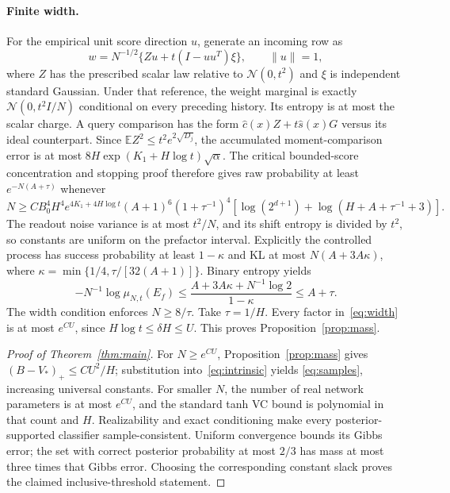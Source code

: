 \documentclass[11pt]{article}
\newcommand{\E}{\mathbb E}
\begin{document}
\paragraph{Finite width.}
For the empirical unit score direction $u$, generate an incoming row as
\[
 w=N^{-1/2}\{Zu+t(I-uu^T)\xi\},\qquad \|u\|=1,
\]
where $Z$ has the prescribed scalar law relative to
$\mathcal N(0,t^2)$ and $\xi$ is independent standard Gaussian.
Under that reference, the weight marginal is exactly
$\mathcal N(0,t^2I/N)$ conditional on every preceding history. Its
entropy is at most the scalar charge. A query comparison has the form
$\widehat c(x)Z+t\widehat s(x)G$ versus its ideal counterpart.
Since $\E Z^2\le t^2e^{2\sqrt{D_j}}$, the accumulated moment-comparison
error is at most $8H\exp(K_1+H\log t)\sqrt\alpha$.
The critical bounded-score concentration and stopping proof therefore
gives raw probability at least $e^{-N(A+\tau)}$ whenever
\begin{equation}\label{eq:width}
 N\ge C B_0^4H^4e^{4K_1+4H\log t}(A+1)^6(1+\tau^{-1})^4
 [\log(2^{d+1})+\log(H+A+\tau^{-1}+3)].
\end{equation}
The readout noise variance is at most $t^2/N$, and its shift entropy
is divided by $t^2$, so constants are uniform on the prefactor interval.
Explicitly the controlled process has success probability at least
$1-\kappa$ and KL at most $N(A+3A\kappa)$, where
$\kappa=\min\{1/4,\tau/[32(A+1)]\}$. Binary entropy yields
\[
 -N^{-1}\log\mu_{N,t}(E_f)
 \le\frac{A+3A\kappa+N^{-1}\log2}{1-\kappa}\le A+\tau.
\]
The width condition enforces $N\ge8/\tau$. Take $\tau=1/H$.
Every factor in~\eqref{eq:width} is at most $e^{CU}$, since
$H\log t\le\delta H\le U$. This proves Proposition~\ref{prop:mass}.

\begin{proof}[Proof of Theorem~\ref{thm:main}]
For $N\ge e^{CU}$, Proposition~\ref{prop:mass} gives
$(B-V_*)_+\le CU^2/H$; substitution into~\eqref{eq:intrinsic} yields
\eqref{eq:samples}, increasing universal constants. For smaller $N$,
the number of real network parameters is at most $e^{CU}$, and the
standard tanh VC bound is polynomial in that count and $H$.
Realizability and exact conditioning make every posterior-supported
classifier sample-consistent. Uniform convergence bounds its Gibbs
error; the set with correct posterior probability at most $2/3$ has
mass at most three times that Gibbs error. Choosing the corresponding
constant slack proves the claimed inclusive-threshold statement.
\end{proof}
\end{document}
